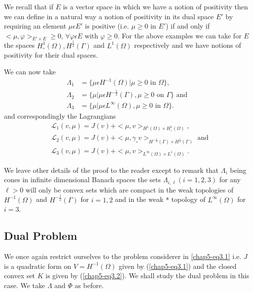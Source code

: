 We recall that if $E$ is a vector space in which we have a notion of positivity then we can define in a natural way a notion of positivity in its dual space $E'$ by requiring an element $\mu \epsilon E'$ is positive (i.e. $\mu \geq 0$ in $E'$) if and only if $<\mu, \varphi>_{E' \times E} \geq 0$, $\forall \varphi \epsilon E$ with $\varphi \geq 0$. For the above examples we can take for $E$ the spaces $H_{\circ}^{1} (\Omega), H^{\frac{1}{2}} (\Gamma)$ and $L^{1} (\Omega)$ respectively and we have notions of positivity for their dual spaces.

We can now take
\begin{align*}
\Lambda_{1} & = \{\mu \epsilon H^{-1} (\Omega) | \mu \geq 0 \text{ in } \Omega \},\\
\Lambda_{2} & = \{\mu | \mu \epsilon H^{-\frac{1}{2}} (\Gamma), \mu \geq 0 \text{ on } \Gamma \} \text{ and }\\
\Lambda_{3} & = \{\mu | \mu \epsilon L^{\infty} (\Omega), \mu \geq 0 \text{ in } \Omega \}.
\end{align*}\pageoriginale
and correspondingly the Lagrangians
\begin{align*}
& \mathscr{L}_{1} (v, \mu) = J(v) + <\mu, v>_{H^{1} (\Omega) \times H_{\circ}^{1} (\Omega)},\\
& \mathscr{L}_{2} (v, \mu) = J(v) + <\mu, \gamma_{\circ} v>_{H^{-\frac{1}{2}}(\Gamma) \times H^{\frac{1}{2}}(\Gamma)} \text{ and }\\
& \mathscr{L}_{3} (v, \mu) = J(v) + <\mu, v>_{L^{\infty} (\Omega) \times L^{1} (\Omega)}.
\end{align*}

We leave other details of the proof to the reader except to remark that $\Lambda_{i}$ being cones in infinite dimensional Banach spaces the sets $\Lambda_{i, \ell} (i = 1, 2, 3)$ for any $\ell > 0$ will only be convex sets which are compact in the weak topologies of $H^{-1} (\Omega)$ and $H^{-\frac{1}{2}}(\Gamma)$ for $i = 1, 2$ and in the weak $*$ topology of $L^{\infty} (\Omega)$ for $i = 3$.


\subsection{Dual Problem}\label{chap5-subsec3.2}

We once again restrict ourselves to the problem considerer in \ref{chap5-eq3.1} i.e. $J$ is a quadratic form on $V = H^{-1} (\Omega)$ given by (\ref{chap5-eq3.1}) and the closed convex set $K$ is given by (\ref{chap5-eq3.2}). We shall study the dual problem in this case. We take $\Lambda$ and $\Phi$ as before.

